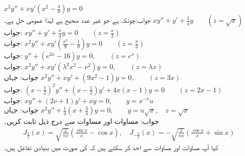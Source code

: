 \quad
$x^2y''+xy'(x^2-\frac{4}{9})y=0$\\
جواب:چونکہ  ہے جو غیر عدد صحیح ہے لہٰذا عمومی حل  ہے۔
\quad
$xy''+y'+\frac{1}{4}y\quad \quad (z=\sqrt{x})$\\
جواب:
\quad
$xy''+y'+\frac{x}{4}y=0\quad \quad (z=\frac{x}{2})$\\
جواب:
\quad
$x^2y''+xy'(\frac{x^2}{9}-\frac{1}{9})y=0\quad \quad (z=\frac{x}{3})$\\
جواب:
\quad
$y''+(e^{2x}-16)y=0,\quad \quad (z=e^x)$\\
جواب:
\quad
$x^2y''+xy'(\lambda^2 x^2-\nu^2)y=0,\quad \quad (z=\lambda x)$\\
جواب: جہاں 
\quad
$x^2y''+xy'+(9x^2-1)y=0,\quad \quad (z=3x)$\\
جواب:
\quad
$(x-\frac{1}{2})^2y''+(x-\frac{1}{2})y'+4x(x-1)y=0\quad \quad(z=2x-1)$\\
جواب:
\quad
$xy''+(2\nu+1)y'+xy=0,\quad \quad y=x^{-\nu}u$\\
جواب: جہاں 
\quad
$x^2y''+\frac{1}{4}(x+\frac{3}{4})y=0,\quad \quad y=u\sqrt{x}, \quad z=\sqrt{x}$\\
جواب:
مساوات  اور مساوات  سے درج ذیل ثابت کریں۔
\begin{align}
J_{\tfrac{3}{2}}(x)=\sqrt{\frac{2}{\pi x}} \left(\frac{\sin x}{x}-\cos x\right), \quad  J_{-\tfrac{3}{2}}(x)=-\sqrt{\frac{2}{\pi x}}\left(\frac{\cos x}{x}+\sin x \right)
\end{align}
کیا آپ مساوات  اور مساوات  سے  اخذ کر سکتے ہیں کہ
  کی صورت میں  بنیادی تفاعل ہیں۔

